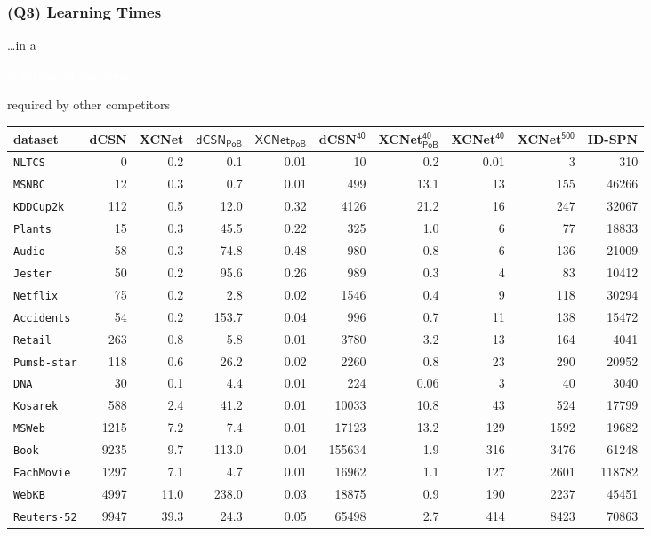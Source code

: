 \documentclass[xcolor={usenames,dvipsnames,svgnames}, compress]{beamer}
\newcommand{\highlighttext}[2][yellow]{{\colorbox{#1}{\strut\textcolor{white}{#2}}}}
\begin{document}
\begin{frame}[t]
  \frametitle{(Q3) Learning Times}

  \scriptsize
\dots in a  \highlighttext[gold4]{\emph{\textbf{fraction of the time}}}
  required by other competitors\vspace{-10pt}
  \begin{table}[t]
  \centering
  \setlength{\tabcolsep}{1pt}  
\tiny
  \begin{tabular}{l rrr r r r r r r}
    dataset           & \textsf{dCSN} & \textsf{XCNet} & $\mathsf{dCSN_{PoB}}$ &
    $\mathsf{XCNet_{PoB}}$ &\textsf{dCSN$^{\mathsf{40}}$} & \textsf{XCNet$^{\mathsf{40}}_\mathsf{PoB}$}& \textsf{XCNet$^{\mathsf{40}}$} & \textsf{XCNet$^{\mathsf{500}}$} & \textsf{ID-SPN}\\
    \midrule
    \texttt{NLTCS}& 0&0.2&0.1	&0.01&10&0.2& 0.01 & 3 &310\\ 
    \texttt{MSNBC} & 12&0.3&0.7&	0.01&499&13.1& 13 & 155 &46266\\ 
    \texttt{KDDCup2k}&112&0.5&12.0&0.32&4126&21.2& 16& 247 &32067\\ 
    \texttt{Plants}&15&0.3&45.5	&0.22&325&1.0& 6 & 77 &18833\\ 
    \texttt{Audio} & 58&0.3&74.8&0.48&980&0.8&6 &136 &21009\\ 
    \texttt{Jester}&50&0.2&95.6&	0.26&989&0.3&4 & 83 &10412\\ 
    \texttt{Netflix}&75&0.2&2.8&	0.02&1546&0.4& 9& 118&30294\\ 
    \texttt{Accidents}&54&0.2&153.7	&0.04&996&0.7& 11& 138 &15472\\ 
    \texttt{Retail}&263&0.8&5.8	&0.01&3780&3.2& 13 & 164&4041\\ 
    \texttt{Pumsb-star}&118&0.6&26.2&	0.02&2260&0.8& 23 & 290 &20952\\ 
    \texttt{DNA}&30&0.1&4.4&	0.01&224&0.06& 3& 40 &3040\\ 
    \texttt{Kosarek}&588&2.4&41.2&	0.01&10033&10.8& 43 &524 &17799\\ 
    \texttt{MSWeb}&1215&7.2&7.4	&0.01&17123&13.2& 129 & 1592 &19682\\ 
    \texttt{Book}&9235&9.7&113.0	&0.04&155634&1.9& 316& 3476&61248\\ 
    \texttt{EachMovie}&1297&7.1&4.7	&0.01&16962&1.1& 127 & 2601&118782\\ 
    \texttt{WebKB}&4997&11.0&238.0&	0.03&18875&0.9& 190 & 2237 &45451\\ 
    \texttt{Reuters-52}&9947&39.3&24.3&	0.05&65498&2.7& 414 & 8423 &70863\\ 

\end{tabular}
\end{table}
\end{frame}
\end{document}
